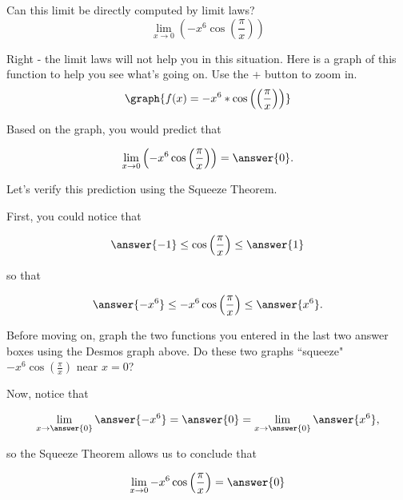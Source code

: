 \documentclass[handout]{ximera}
\begin{document}
\begin{exercise}
Can this limit be directly computed by limit laws?
  \[
  \displaystyle\lim_{x\to 0} \left(-x^6\cos\left(\frac{\pi}{x}\right)\right)
  \]
  
  \begin{multipleChoice}
  \end{multipleChoice}
  
\begin{exercise}
  
Right - the limit laws will not help you in this situation.  Here is a graph of this function to help you see what's going on.  Use the + button to zoom in.
  \[
   \graph{f(x)=-x^6*\cos\left(\left(\frac{\pi}{x}\right)\right)}
  \]
  
Based on the graph, you would predict that 

\[
  \displaystyle\lim_{x\to 0} \left(-x^6\cos\left(\frac{\pi}{x}\right)\right) = \answer{0}.
  \]
\begin{exercise}

Let's verify this prediction using the Squeeze Theorem.
 
First, you could notice that 

\[ \answer{-1} \leq \cos\left(\frac{\pi}{x}\right) \leq \answer{1} \]

so that
   
\[ \answer{-x^6} \leq -x^6\cos\left(\frac{\pi}{x}\right) \leq \answer{x^6}. \]

Before moving on, graph the two functions you entered in the last two answer boxes using the Desmos graph above.  Do these two graphs ``squeeze" $-x^6\cos\left(\frac{\pi}{x}\right)$ near $x=0$?

Now, notice that 

\[ \displaystyle\lim_{x \to \answer{0}} \answer{-x^6} = \answer{0} = \displaystyle\lim_{x \to \answer{0}} \answer{x^6},\]

so the Squeeze Theorem allows us to conclude that 

\[ \displaystyle\lim_{x \to 0}  -x^6\cos\left(\frac{\pi}{x}\right) = \answer{0} \]

\end{exercise}
\end{exercise}
\end{exercise}
\end{document}
